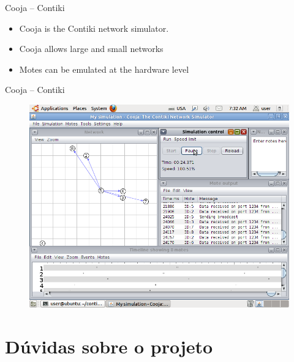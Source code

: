 \documentclass{beamer}
\begin{document}
\begin{frame}

\begin{block}{Cooja -- Contiki}

	\begin{itemize}
		\item Cooja is the Contiki network simulator.
		\item Cooja allows large and small networks
		\item Motes can be emulated at the hardware level
	\end{itemize}

\end{block}

\begin{block}{Cooja -- Contiki}

	\begin{figure}[t]
		\includegraphics[width=.8\linewidth]{img/cooja.png}
	\end{figure}

\end{block}

\end{frame}
\section{Dúvidas sobre o projeto}
\end{document}
